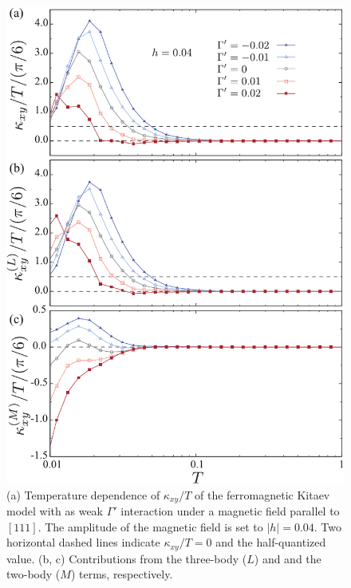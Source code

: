 \documentclass[reprint,amsmath,amssymb,aps,prx]{revtex4-2}
\begin{document}
\begin{figure}
  \begin{center}
    \includegraphics[width=0.9\linewidth]{plot_k_all_h0.04_Gp.pdf}
  \end{center}
  \caption{(a) Temperature dependence of $\kappa_{xy}/T$ of the ferromagnetic Kitaev model with as weak $\Gamma'$ interaction under a magnetic field parallel to $[111]$. The amplitude of the magnetic field is set to $|h|=0.04$. Two horizontal dashed lines indicate $\kappa_{xy}/T = 0$ and the half-quantized value. (b, c) Contributions from the three-body ($L$) and and the two-body ($M$) terms, respectively.}
  \label{fig:k_all_h0.04_Gp}
\end{figure}
\end{document}
